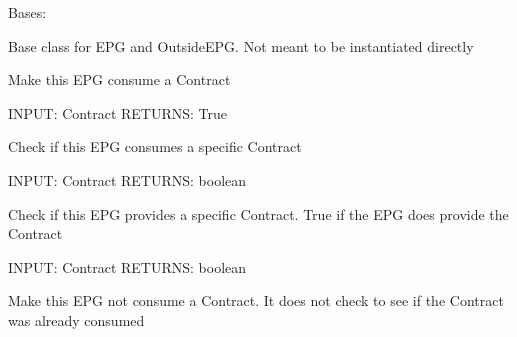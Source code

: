 \documentclass[letterpaper,10pt,english]{sphinxmanual}
\begin{document}

\begin{fulllineitems}
\label{acitoolkit:acitoolkit.CommonEPG}
Bases: {\hyperref[acibaseobject:acibaseobject.BaseACIObject]{}}

Base class for EPG and OutsideEPG.
Not meant to be instantiated directly

\begin{fulllineitems}
\label{acitoolkit:acitoolkit.CommonEPG.consume}
Make this EPG consume a Contract

INPUT: Contract
RETURNS: True

\end{fulllineitems}


\begin{fulllineitems}
\label{acitoolkit:acitoolkit.CommonEPG.does_consume}
Check if this EPG consumes a specific Contract

INPUT: Contract
RETURNS: boolean

\end{fulllineitems}


\begin{fulllineitems}
\label{acitoolkit:acitoolkit.CommonEPG.does_provide}
Check if this EPG provides a specific Contract.
True if the EPG does provide the Contract

INPUT: Contract
RETURNS: boolean

\end{fulllineitems}


\begin{fulllineitems}
\label{acitoolkit:acitoolkit.CommonEPG.dont_consume}
Make this EPG not consume a Contract.  It does not check to see
if the Contract was already consumed


\end{fulllineitems}
\end{fulllineitems}
\end{document}
